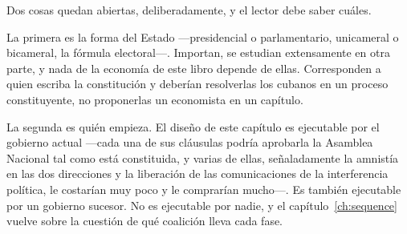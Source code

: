 Dos cosas quedan abiertas, deliberadamente, y el lector debe saber cuáles.

La primera es la forma del Estado ---presidencial o parlamentario, unicameral o
bicameral, la fórmula electoral---. Importan, se estudian extensamente en otra
parte, y nada de la economía de este libro depende de ellas. Corresponden a quien
escriba la constitución y deberían resolverlas los cubanos en un proceso
constituyente, no proponerlas un economista en un capítulo.

La segunda es quién empieza. El diseño de este capítulo es ejecutable por el
gobierno actual ---cada una de sus cláusulas podría aprobarla la Asamblea Nacional
tal como está constituida, y varias de ellas, señaladamente la amnistía en las dos
direcciones y la liberación de las comunicaciones de la interferencia política, le
costarían muy poco y le comprarían mucho---. Es también ejecutable por un gobierno
sucesor. No es ejecutable por nadie, y el capítulo~\ref{ch:sequence} vuelve sobre la
cuestión de qué coalición lleva cada fase.
